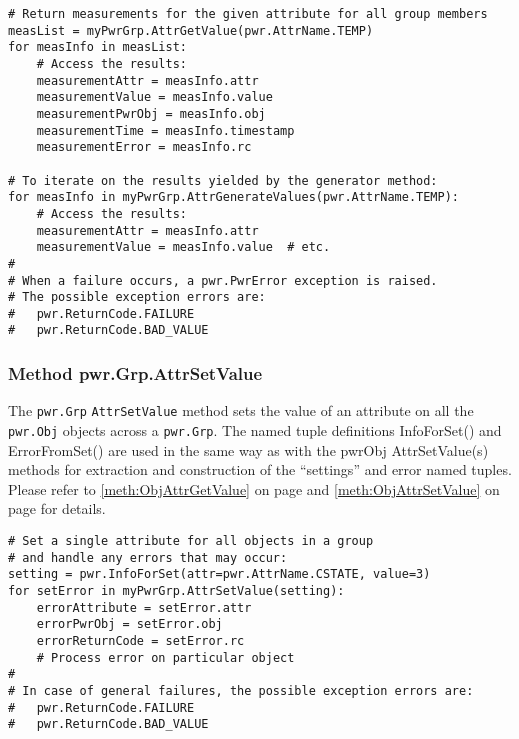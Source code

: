 \documentclass[12pt]{report} %
\begin{document}
\begin{appendices}
\begin{center}\begin{minipage}{.95\linewidth}\begin{lstlisting}
# Return measurements for the given attribute for all group members
measList = myPwrGrp.AttrGetValue(pwr.AttrName.TEMP)
for measInfo in measList:
    # Access the results:
    measurementAttr = measInfo.attr
    measurementValue = measInfo.value
    measurementPwrObj = measInfo.obj
    measurementTime = measInfo.timestamp
    measurementError = measInfo.rc

# To iterate on the results yielded by the generator method:
for measInfo in myPwrGrp.AttrGenerateValues(pwr.AttrName.TEMP):
    # Access the results:
    measurementAttr = measInfo.attr
    measurementValue = measInfo.value  # etc.
#
# When a failure occurs, a pwr.PwrError exception is raised.
# The possible exception errors are:
#   pwr.ReturnCode.FAILURE
#   pwr.ReturnCode.BAD_VALUE
\end{lstlisting}\end{minipage}\end{center}

\subsubsection{Method pwr.Grp.AttrSetValue}
\label{meth:GrpAttrSetValue}

The \texttt{pwr.Grp} \texttt{AttrSetValue} method sets the value of an attribute on all the
\texttt{pwr.Obj} objects across a \texttt{pwr.Grp}.  The named tuple definitions
InfoForSet() and ErrorFromSet() are used in the same way as with the pwrObj
AttrSetValue(s) methods for extraction and construction of the ``settings''
and error named tuples. Please refer to \ref{meth:ObjAttrGetValue} on page
\pageref{meth:ObjAttrGetValue} and \ref{meth:ObjAttrSetValue} on page
\pageref{meth:ObjAttrSetValue} for details.

\begin{center}\begin{minipage}{.95\linewidth}\begin{lstlisting}
# Set a single attribute for all objects in a group
# and handle any errors that may occur:
setting = pwr.InfoForSet(attr=pwr.AttrName.CSTATE, value=3)
for setError in myPwrGrp.AttrSetValue(setting):
    errorAttribute = setError.attr
    errorPwrObj = setError.obj
    errorReturnCode = setError.rc
    # Process error on particular object
#
# In case of general failures, the possible exception errors are:
#   pwr.ReturnCode.FAILURE
#   pwr.ReturnCode.BAD_VALUE
\end{lstlisting}\end{minipage}\end{center}


\end{appendices}
\end{document}
